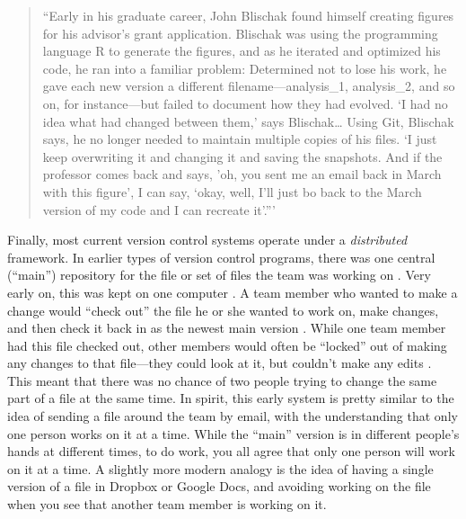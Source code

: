 \documentclass[]{tufte-book}
\begin{document}
\begin{quote}
``Early in his graduate career, John Blischak found himself creating figures
for his advisor's grant application. Blischak was using the programming language
R to generate the figures, and as he iterated and optimized his code, he ran
into a familiar problem: Determined not to lose his work, he gave each new
version a different filename---analysis\_1, analysis\_2, and so on, for
instance---but failed to document how they had evolved. `I had no idea what had
changed between them,' says Blischak\ldots{} Using Git, Blischak says, he no longer
needed to maintain multiple copies of his files. `I just keep overwriting it and
changing it and saving the snapshots. And if the professor comes back and says,
'oh, you sent me an email back in March with this figure', I can say, `okay,
well, I'll just bo back to the March version of my code and I can recreate
it'.''' \citep{perkel2018git}
\end{quote}

Finally, most current version control systems operate under a \emph{distributed}
framework. In earlier types of version control programs, there was one central
(``main'') repository for the file or set of files the team was working on
\citep{raymondunderstanding, target2018version}. Very early on, this was kept on one
computer \citep{irving2011astonishments}. A team member who wanted to make a change
would ``check out'' the file he or she wanted to work on, make changes, and then
check it back in as the newest main version \citep{raymond2003art}. While one team
member had this file checked out, other members would often be ``locked'' out of
making any changes to that file---they could look at it, but couldn't make any
edits \citep{raymondunderstanding, target2018version}. This meant that there was no
chance of two people trying to change the same part of a file at the same time.
In spirit, this early system is pretty similar to the idea of sending a file
around the team by email, with the understanding that only one person works on
it at a time. While the ``main'' version is in different people's hands at
different times, to do work, you all agree that only one person will work on it
at a time. A slightly more modern analogy is the idea of having a single version
of a file in Dropbox or Google Docs, and avoiding working on the file when you
see that another team member is working on it.
\end{document}
